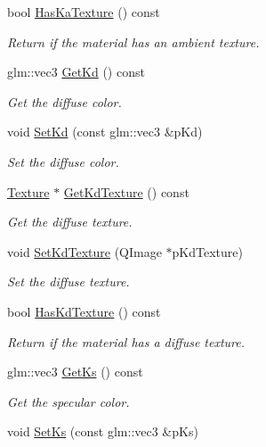 \begin{DoxyCompactItemize}
bool \hyperlink{class_material_a28e6f4150ffd94d9764344d6c016d6fe}{Has\+Ka\+Texture} () const 
\begin{DoxyCompactList}\small\item\em Return if the material has an ambient texture. \end{DoxyCompactList}\item 
glm\+::vec3 \hyperlink{class_material_a64dbdf642209dd5dc53c8abf83b4aa9c}{Get\+Kd} () const 
\begin{DoxyCompactList}\small\item\em Get the diffuse color. \end{DoxyCompactList}\item 
void \hyperlink{class_material_a2f99e5b13e334514f46a62906478178d}{Set\+Kd} (const glm\+::vec3 \&p\+Kd)
\begin{DoxyCompactList}\small\item\em Set the diffuse color. \end{DoxyCompactList}\item 
\hyperlink{class_texture}{Texture} $\ast$ \hyperlink{class_material_ae4c5b49123403c889e2dd65ea9ba6931}{Get\+Kd\+Texture} () const 
\begin{DoxyCompactList}\small\item\em Get the diffuse texture. \end{DoxyCompactList}\item 
void \hyperlink{class_material_a4618eda20fbb555bae125324fa455f5b}{Set\+Kd\+Texture} (Q\+Image $\ast$p\+Kd\+Texture)
\begin{DoxyCompactList}\small\item\em Set the diffuse texture. \end{DoxyCompactList}\item 
bool \hyperlink{class_material_a367b6507a336267de8c2cfd7cb012068}{Has\+Kd\+Texture} () const 
\begin{DoxyCompactList}\small\item\em Return if the material has a diffuse texture. \end{DoxyCompactList}\item 
glm\+::vec3 \hyperlink{class_material_a346ad67fb1206363ea4fd4cc7352cd48}{Get\+Ks} () const 
\begin{DoxyCompactList}\small\item\em Get the specular color. \end{DoxyCompactList}\item 
void \hyperlink{class_material_a0240b0562f6feee21b54db3df3cac8d4}{Set\+Ks} (const glm\+::vec3 \&p\+Ks)

\end{DoxyCompactItemize}
